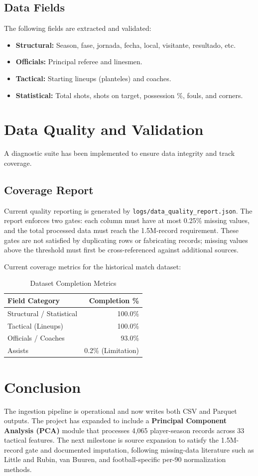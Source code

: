 \documentclass[12pt,a4paper]{article}
\begin{document}
\subsection{Data Fields}
The following fields are extracted and validated:
\begin{itemize}
    \item \textbf{Structural:} Season, fase, jornada, fecha, local, visitante, resultado, etc.
    \item \textbf{Officials:} Principal referee and linesmen.
    \item \textbf{Tactical:} Starting lineups (planteles) and coaches.
    \item \textbf{Statistical:} Total shots, shots on target, possession \%, fouls, and corners.
\end{itemize}

\section{Data Quality and Validation}
A diagnostic suite has been implemented to ensure data integrity and track coverage.

\subsection{Coverage Report}
Current quality reporting is generated by \texttt{logs/data\_quality\_report.json}. The report enforces two gates: each column must have at most 0.25\% missing values, and the total processed data must reach the 1.5M-record requirement. These gates are not satisfied by duplicating rows or fabricating records; missing values above the threshold must first be cross-referenced against additional sources.

Current coverage metrics for the historical match dataset:
\begin{table}[h]
\centering
\begin{tabular}{lr}
\toprule
Field Category & Completion \% \\
\midrule
Structural / Statistical & 100.0\% \\
Tactical (Lineups) & 100.0\% \\
Officials / Coaches & ~93.0\% \\
Assists & 0.2\% (Limitation) \\
\bottomrule
\end{tabular}
\caption{Dataset Completion Metrics}
\end{table}

\section{Conclusion}
The ingestion pipeline is operational and now writes both CSV and Parquet outputs. The project has expanded to include a \textbf{Principal Component Analysis (PCA)} module that processes 4,065 player-season records across 33 tactical features. The next milestone is source expansion to satisfy the 1.5M-record gate and documented imputation, following missing-data literature such as Little and Rubin, van Buuren, and football-specific per-90 normalization methods.
\end{document}
